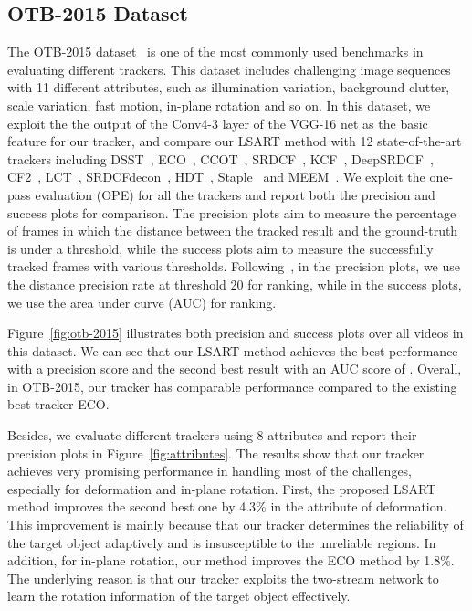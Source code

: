 \documentclass[10pt,twocolumn,letterpaper]{article}
\begin{document}
\subsection{OTB-2015 Dataset}
The OTB-2015 dataset~\cite{wu2015object} is one of the most commonly used
benchmarks in evaluating different trackers. This dataset includes  challenging image
sequences with 11 different attributes, such as illumination variation, background clutter,
scale variation, fast motion, in-plane rotation and so on.
In this dataset, we exploit the the output of the Conv4-3 layer
of the VGG-16 net as the basic feature for our tracker, and compare our LSART method with 12 state-of-the-art trackers including DSST~\cite{danelljan2014accurate},
ECO~\cite{danelljan2016eco}, CCOT~\cite{danelljan2016beyond}, SRDCF~\cite{danelljan2015learning}, KCF~\cite{henriques2015high},
DeepSRDCF~\cite{danelljan2015convolutional}, CF2~\cite{ma2015hierarchical}, LCT~\cite{ma2015long},
SRDCFdecon~\cite{danelljan2016adaptive},  HDT~\cite{qi2016hedged},  Staple~\cite{bertinetto2016staple} and MEEM~\cite{zhang2014meem}.
We exploit the one-pass evaluation (OPE) for all the trackers and report both the precision and success plots for comparison.
The precision plots aim to measure the percentage of frames in which the distance between the tracked result and the ground-truth
is under a threshold, while the success plots aim to measure the successfully tracked frames with various thresholds.
Following~\cite{WuLimYang13}, in the precision plots, we use the distance precision rate at threshold 20 for ranking,
while in the success plots, we use the area under curve (AUC) for ranking.

Figure~\ref{fig:otb-2015} illustrates both precision and success plots over all  videos in this dataset.
We can see that our LSART method achieves the best performance with a precision score 
and the second best result with an AUC score of .
Overall, in OTB-2015, our tracker has comparable performance compared to the existing best tracker
ECO.

Besides, we evaluate different trackers using 8 attributes and report their precision plots
in Figure~\ref{fig:attributes}.
The results show that our tracker achieves very promising performance in handling most of the challenges,
especially for deformation and in-plane rotation.
First, the proposed LSART method improves the second best one by 4.3\% in the attribute of deformation.
This improvement is mainly because that our tracker determines the reliability of the target object adaptively
and is insusceptible to the unreliable regions.
In addition, for in-plane rotation, our method improves the ECO method by 1.8\%. The underlying reason is that
our tracker exploits the two-stream network to learn the rotation information of the target object effectively.
\end{document}

